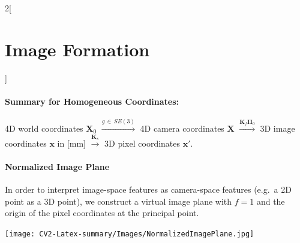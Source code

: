 \documentclass[oneside,fontsize=11pt,paper=a4]{scrartcl}
\newenvironment{myfigure}
  {\par\medskip\noindent\minipage{\linewidth}}
  {\endminipage\par\medskip}
\begin{document}
\begin{multicols}{2}[\section{Image Formation}]
\paragraph{Summary for Homogeneous Coordinates:} 4D world coordinates $\boldsymbol{X}_0$ $\xrightarrow{g \, \in \, SE(3)}$ 4D camera coordinates $\boldsymbol{X}$ $\xrightarrow{\mathbf{K}_f \mathbf{\Pi}_0}$ 3D image coordinates $\boldsymbol{x}$ in [mm] $\xrightarrow{\mathbf{K}_s}$ 3D pixel coordinates $\boldsymbol{x'}$.

\paragraph{Normalized Image Plane} In order to interpret image-space features as camera-space features (e.g.\ a 2D point as a 3D point), we construct a virtual image plane with $f=1$ and the origin of the pixel coordinates at the principal point.
\begin{myfigure}
    \texttt{[image: CV2-Latex-summary/Images/NormalizedImagePlane.jpg]}
\end{myfigure}


\end{multicols}
\end{document}
